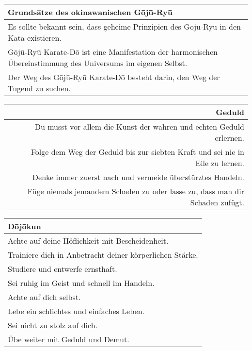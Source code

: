 \begin{tcolorbox}[colframe=lightgray,colback=white,coltitle=black,title=Allgemeines:\indent Grundsätze und D\={o}j\={o}kun nach Miyagi Chojun]	
	\begin{footnotesize}
		\begin{tabularx}{\textwidth}{X}
			\textbf{Grundsätze des okinawanischen G\={o}j\={u}-Ry\={u}} \\
			\midrule
			Es sollte bekannt sein, dass geheime Prinzipien des G\={o}j\={u}-Ry\={u} in den Kata existieren. \\
			G\={o}j\={u}-Ry\={u} Karate-D\={o} ist eine Manifestation der harmonischen Übereinstimmung des Universums im eigenen Selbst. \\ 
			Der Weg des G\={o}j\={u}-Ry\={u} Karate-D\={o} besteht darin, den Weg der Tugend zu suchen.\\
		\end{tabularx}\null\vfill\null
		\begin{tabularx}{\textwidth}{Xr}	
			\hfill & \textbf{Geduld} \\
			\midrule
			\hfill & Du musst vor allem die Kunst der wahren und echten Geduld erlernen. \\
			\hfill & Folge dem Weg der Geduld bis zur siebten Kraft und sei nie in Eile zu lernen. \\
			\hfill & Denke immer zuerst nach und vermeide überstürztes Handeln. \\
			\hfill & Füge niemals jemandem Schaden zu oder lasse zu, dass man dir Schaden zufügt. \\
		\end{tabularx}\null\vfill\null
		\begin{tabularx}{\textwidth}{X}	
			\textbf{D\={o}j\={o}kun}\\
			\midrule
			Achte auf deine Höflichkeit mit Bescheidenheit. \\
			Trainiere dich in Anbetracht deiner körperlichen Stärke. \\
			Studiere und entwerfe ernsthaft. \\
			Sei ruhig im Geist und schnell im Handeln. \\
			Achte auf dich selbst. \\
			Lebe ein schlichtes und einfaches Leben. \\
			Sei nicht zu stolz auf dich. \\
			Übe weiter mit Geduld und Demut. \\
		\end{tabularx}\null\vfill\null

\end{footnotesize}
\end{tcolorbox}
